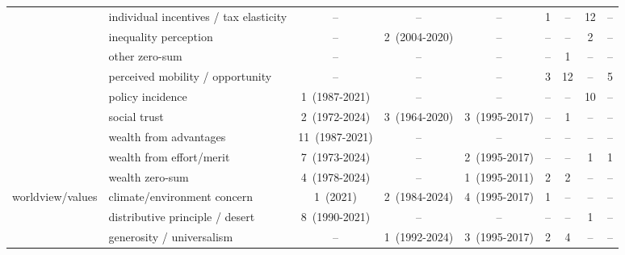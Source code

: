 \documentclass[11pt, headsepline]{article}
\begin{document}
\begin{landscape}
\begin{longtable}{@{}l p{2.6in} ccc cccc@{}}
 & individual incentives / tax elasticity & \textcolor[gray]{0.62}{--} & \textcolor[gray]{0.62}{--} & \textcolor[gray]{0.62}{--} & 1 & \textcolor[gray]{0.62}{--} & 12 & \textcolor[gray]{0.62}{--} \\
 & inequality perception & \textcolor[gray]{0.62}{--} & 2~(2004-2020) & \textcolor[gray]{0.62}{--} & \textcolor[gray]{0.62}{--} & \textcolor[gray]{0.62}{--} & 2 & \textcolor[gray]{0.62}{--} \\
 & other zero-sum & \textcolor[gray]{0.62}{--} & \textcolor[gray]{0.62}{--} & \textcolor[gray]{0.62}{--} & \textcolor[gray]{0.62}{--} & 1 & \textcolor[gray]{0.62}{--} & \textcolor[gray]{0.62}{--} \\
 & perceived mobility / opportunity & \textcolor[gray]{0.62}{--} & \textcolor[gray]{0.62}{--} & \textcolor[gray]{0.62}{--} & 3 & 12 & \textcolor[gray]{0.62}{--} & 5 \\
 & policy incidence & 1~(1987-2021) & \textcolor[gray]{0.62}{--} & \textcolor[gray]{0.62}{--} & \textcolor[gray]{0.62}{--} & \textcolor[gray]{0.62}{--} & 10 & \textcolor[gray]{0.62}{--} \\
 & social trust & 2~(1972-2024) & 3~(1964-2020) & 3~(1995-2017) & \textcolor[gray]{0.62}{--} & 1 & \textcolor[gray]{0.62}{--} & \textcolor[gray]{0.62}{--} \\
 & wealth from advantages & 11~(1987-2021) & \textcolor[gray]{0.62}{--} & \textcolor[gray]{0.62}{--} & \textcolor[gray]{0.62}{--} & \textcolor[gray]{0.62}{--} & \textcolor[gray]{0.62}{--} & \textcolor[gray]{0.62}{--} \\
 & wealth from effort/merit & 7~(1973-2024) & \textcolor[gray]{0.62}{--} & 2~(1995-2017) & \textcolor[gray]{0.62}{--} & \textcolor[gray]{0.62}{--} & 1 & 1 \\
 & wealth zero-sum & 4~(1978-2024) & \textcolor[gray]{0.62}{--} & 1~(1995-2011) & 2 & 2 & \textcolor[gray]{0.62}{--} & \textcolor[gray]{0.62}{--} \\
\addlinespace[2pt]
worldview/values & climate/environment concern & 1~(2021) & 2~(1984-2024) & 4~(1995-2017) & 1 & \textcolor[gray]{0.62}{--} & \textcolor[gray]{0.62}{--} & \textcolor[gray]{0.62}{--} \\
 & distributive principle / desert & 8~(1990-2021) & \textcolor[gray]{0.62}{--} & \textcolor[gray]{0.62}{--} & \textcolor[gray]{0.62}{--} & \textcolor[gray]{0.62}{--} & 1 & \textcolor[gray]{0.62}{--} \\
 & generosity / universalism & \textcolor[gray]{0.62}{--} & 1~(1992-2024) & 3~(1995-2017) & 2 & 4 & \textcolor[gray]{0.62}{--} & \textcolor[gray]{0.62}{--} \\

\end{longtable}
\end{landscape}
\end{document}
